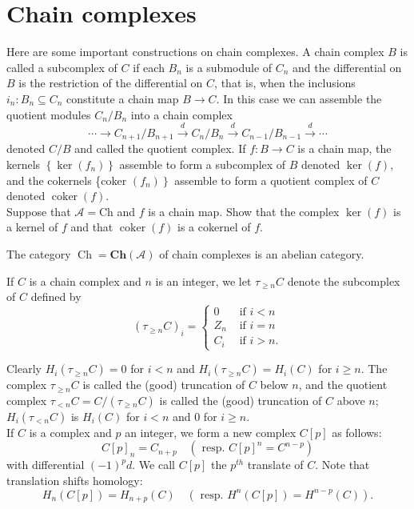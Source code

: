\section{Chain complexes}

Here are some important constructions on chain complexes. A chain complex $B$ is called a subcomplex of $C$ if each $B_n$ is a submodule of $C_n$ and the differential on $B$ is the restriction of the differential on $C$, that is, when the inclusions $i_n: B_n \subseteq C_n$ constitute a chain map $B \rightarrow C$. In this case we can assemble the quotient modules $C_n / B_n$ into a chain complex
$$
\cdots \rightarrow C_{n+1} / B_{n+1} \xrightarrow{d} C_n / B_n \xrightarrow{d} C_{n-1} / B_{n-1} \xrightarrow{d} \cdots
$$
denoted $C / B$ and called the quotient complex. If $f: B \rightarrow C$ is a chain map, the kernels $\left\{\operatorname{ker}\left(f_n\right)\right\}$ assemble to form a subcomplex of $B$ denoted $\operatorname{ker}(f)$, and the cokernels \{coker $\left.\left(f_n\right)\right\}$ assemble to form a quotient complex of $C$ denoted $\operatorname{coker}(f)$.\\
Suppose that $\mathcal{A}=\mathrm{Ch}$ and $f$ is a chain map. Show that the complex $\operatorname{ker}(f)$ is a kernel of $f$ and that $\operatorname{coker}(f)$ is a cokernel of $f$.

\begin{theo}
The category $\operatorname{Ch}=\mathbf{C h}(\mathcal{A})$ of chain complexes is an abelian category.   
\end{theo}

If $C$ is a chain complex and $n$ is an integer, we let $\tau_{\geq n} C$ denote the subcomplex of $C$ defined by
$$
\left(\tau_{\geq n} C\right)_i= \begin{cases}0 & \text { if } i<n \\ Z_n & \text { if } i=n \\ C_i & \text { if } i>n .\end{cases}
$$

Clearly $H_i\left(\tau_{\geq n} C\right)=0$ for $i<n$ and $H_i\left(\tau_{\geq n} C\right)=H_i(C)$ for $i \geq n$. The complex $\tau_{\geq n} C$ is called the (good) truncation of $C$ below $n$, and the quotient complex $\tau_{<n} C=C /\left(\tau_{\geq n} C\right)$ is called the (good) truncation of $C$ above $n$; $H_i\left(\tau_{<n} C\right)$ is $H_i(C)$ for $i<n$ and 0 for $i \geq n$.\\

If $C$ is a complex and $p$ an integer, we form a new complex $C[p]$ as follows:
$$
C[p]_n=C_{n+p} \quad\left(\text { resp. } C[p]^n=C^{n-p}\right)
$$
with differential $(-1)^p d$. We call $C[p]$ the $p^{t h}$ translate of $C$. Note that translation shifts homology:
$$
H_n(C[p])=H_{n+p}(C) \quad\left(\text { resp. } H^n(C[p])=H^{n-p}(C)\right) .
$$

